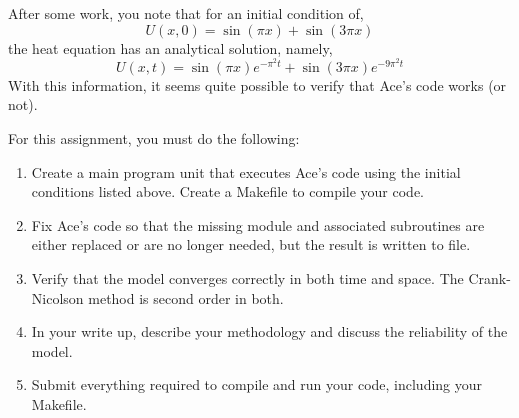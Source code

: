 \documentclass[12pt, letterpaper]{article}
\begin{document}
After some work, you note that for an initial condition of,
\begin{equation}
  U(x,0) = \sin(\pi x) + \sin(3 \pi x)
\end{equation}
the heat equation has an analytical solution, namely,
\begin{equation}
  U(x,t) = \sin(\pi x)e^{-\pi^2t}+\sin(3\pi x)e^{-9\pi^2t}
\end{equation}
With this information, it seems quite possible to verify that Ace's code works
(or not).

For this assignment, you must do the following:
\begin{enumerate}
  \item Create a main program unit that executes Ace's code using the
    initial conditions listed above.  Create a Makefile to compile your code.
  \item Fix Ace's code so that the missing module and associated subroutines
    are either replaced or are no longer needed, but the result is written 
    to file.
  \item Verify that the model converges correctly in both time and space.
    The Crank-Nicolson method is second order in both.
  \item In your write up, describe your methodology and discuss the 
    reliability of the model.
  \item Submit everything required to compile and run your code, including
    your Makefile.
\end{enumerate}



\end{document}
